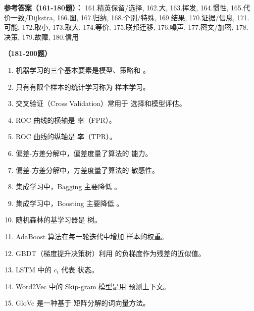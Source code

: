 \textbf{参考答案（161-180题）：}
161.精英保留/选择, 162.大, 163.挥发, 164.惯性, 165.代价一致/Dijkstra, 166.图, 167.归纳, 168.个别/特殊, 169.结果, 170.证据/信息, 171.可能, 172.取小, 173.取大, 174.等价, 175.联邦迁移, 176.噪声, 177.密文/加密, 178.决策, 179.故障, 180.信用

\vspace{1em}
\textbf{（181-200题）}
\begin{enumerate}[resume,leftmargin=2em,itemsep=1pt]
\item 机器学习的三个基本要素是模型、策略和 \underline{\hspace{3em}}。
\item 只有有限个样本的统计学习称为 \underline{\hspace{3em}} 样本学习。
\item 交叉验证（Cross Validation）常用于 \underline{\hspace{3em}} 选择和模型评估。
\item ROC 曲线的横轴是 \underline{\hspace{3em}} 率（FPR）。
\item ROC 曲线的纵轴是 \underline{\hspace{3em}} 率（TPR）。
\item 偏差-方差分解中，偏差度量了算法的 \underline{\hspace{3em}} 能力。
\item 偏差-方差分解中，方差度量了算法的 \underline{\hspace{3em}} 敏感性。
\item 集成学习中，Bagging 主要降低 \underline{\hspace{3em}}。
\item 集成学习中，Boosting 主要降低 \underline{\hspace{3em}}。
\item 随机森林的基学习器是 \underline{\hspace{3em}} 树。
\item AdaBoost 算法在每一轮迭代中增加 \underline{\hspace{3em}} 样本的权重。
\item GBDT（梯度提升决策树）利用 \underline{\hspace{3em}} 的负梯度作为残差的近似值。
\item LSTM 中的 $c_t$ 代表 \underline{\hspace{3em}} 状态。
\item Word2Vec 中的 Skip-gram 模型是用 \underline{\hspace{3em}} 预测上下文。
\item GloVe 是一种基于 \underline{\hspace{3em}} 矩阵分解的词向量方法。

\end{enumerate}
